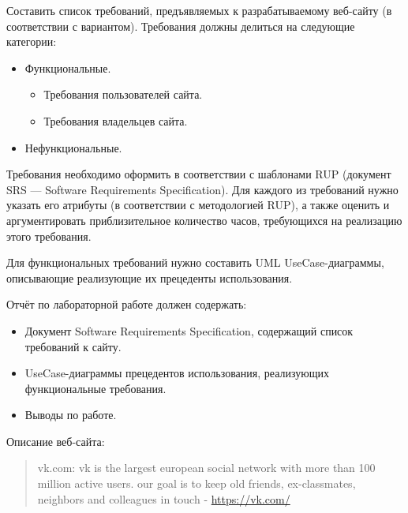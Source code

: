 Составить список требований, предъявляемых к разрабатываемому веб-сайту (в соответствии с вариантом).
Требования должны делиться на следующие категории:
\begin{itemize}
\item Функциональные.
\begin{itemize}
\item Требования пользователей сайта.
\item Требования владельцев сайта.
\end{itemize}
\item Нефункциональные.
\end{itemize}
Требования необходимо оформить в соответствии с шаблонами RUP
(документ SRS --- Software Requirements Specification).
Для каждого из требований нужно указать его атрибуты
(в соответствии с методологией RUP),
а также оценить и аргументировать приблизительное количество часов,
требующихся на реализацию этого требования.

Для функциональных требований нужно составить UML UseCase-диаграммы, описывающие реализующие их прецеденты использования.

Отчёт по лабораторной работе должен содержать:
\begin{itemize}
\item Документ Software Requirements Specification, содержащий список требований к сайту.
\item UseCase-диаграммы прецедентов использования, реализующих функциональные требования.
\item Выводы по работе.
\end{itemize}

Описание веб-сайта:
\begin{quote}
  vk.com: vk is the largest european social network with more than 100 million active users. our goal is to keep old friends, ex-classmates, neighbors and colleagues in touch - \url{https://vk.com/}
\end{quote}

